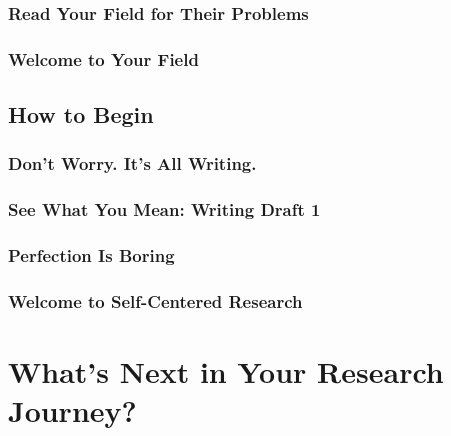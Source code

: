\documentclass[11pt]{article}
\begin{document}
\subsubsection{Read Your Field for Their Problems}
\subsubsection{Welcome to Your Field}

\subsection{How to Begin}
\subsubsection{Don’t Worry. It’s All Writing.}
\subsubsection{See What You Mean: Writing Draft 1}
\subsubsection{Perfection Is Boring}
\subsubsection{Welcome to Self-Centered Research}

\section{What's Next in Your Research Journey?}


\newpage


\end{document}
